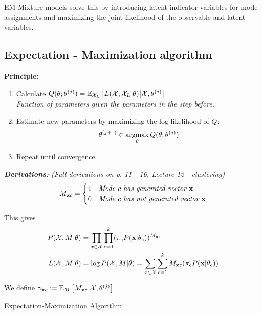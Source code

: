 EM Mixture models solve this by introducing latent indicator variables for mode assignments and maximizing the joint likelihood of the observable and latent variables.

\subsection{Expectation - Maximization algorithm}

\textbf{Principle: }
\begin{enumerate}
	\item Calculate $Q(\theta; \theta^{(j)}) = \mathbb E_{\mathcal X_L}\left[L(\mathcal X, \mathcal X_L|\theta) \middle\vert \mathcal X, \theta^{(j)}\right]$ \\
		\textit{Function of parameters given the parameters in the step before.}
	\item Estimate new parameters by maximizing the log-likelihood of $Q$: 
	$$\theta^{(j+1)}\in \mathop{\mathrm{argmax}}_{\theta}Q(\theta; \theta^{(j)})$$
	\item Repeat until convergence
\end{enumerate}
\textit{\textbf{Derivations: } (Full derivations on p. 11 - 16, Lecture 12 - clustering)}
$$
	M_{\mathbf x c} = 
	\begin{cases}
		1 &\textit{Mode $c$ has generated vector $\mathbf x$} \\
		0 &\textit{Mode $c$ has not generated vector $\mathbf x$}
	\end{cases}
$$

This gives
\begin{align*}
	P(\mathcal X, M|\theta) &= \prod_{x\in\mathcal X}\prod_{c=1}^k(\pi_c P(\mathbf x|\theta_c))^{M_{\mathbf x c}}\\
	L(\mathcal X, M|\theta) &= \log P(\mathcal X, M|\theta) =\sum_{x\in\mathcal X}\sum_{c=1}^k M_{\mathbf x c}(\pi_c P(\mathbf x|\theta_c))
\end{align*}

We define
$
	\gamma_{\mathbf x c} := \mathbb E_M\left[M_{\mathbf x c}\middle \vert \mathcal X, \theta^{(j)}\right]
$



\begin{algorithm}[H]  
	
  \caption{Expectation-Maximization Algorithm}
\end{algorithm}

